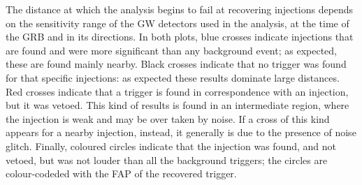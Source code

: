 \documentclass[binding=0.6cm, LaM]{sapthesis}
\begin{document}
	The distance at which the analysis begins to fail at recovering injections 
	depends on the sensitivity range of the GW detectors used in the analysis, 
	at the time of the GRB and in its directions.
	In both plots, blue crosses indicate injections that are found 
	and were more significant than any background event;
	as expected, these are found mainly nearby.
	Black crosses indicate that no trigger was found for that specific injections: 
	as expected these results dominate large distances.
	Red crosses indicate that a trigger is found in correspondence with an injection, 			
	but it was vetoed.  
	This kind of results is found in an intermediate region, 
	where the injection is weak and may be over taken by noise.  
	If a cross of this kind appears for a nearby injection, instead, 
	it generally is due to the presence of noise glitch. 
	Finally, coloured circles indicate that the injection was found, and not vetoed, 
	but was not louder than all the background triggers;  
	the circles are colour-codeded with the FAP of the recovered trigger.
	
\end{document}
